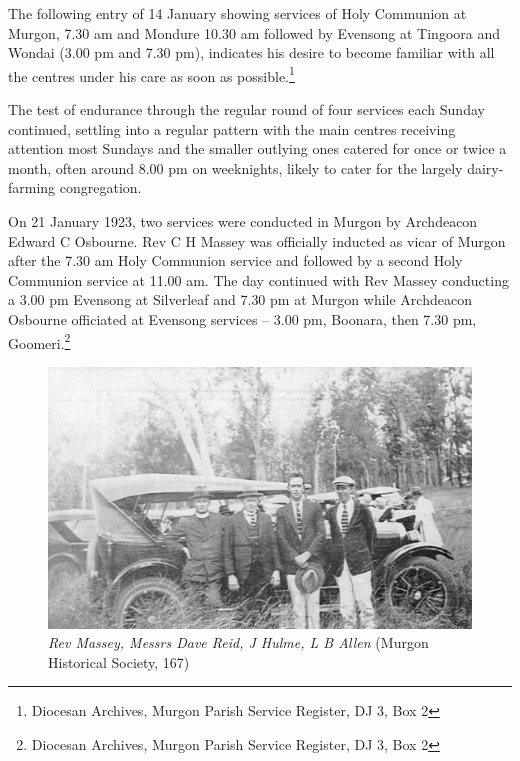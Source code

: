 \smallskip


The following entry of 14 January showing services of Holy Communion at Murgon, 7.30 am and Mondure 10.30 am followed by Evensong at Tingoora and Wondai (3.00 pm and 7.30 pm), indicates his desire to become familiar with all the centres under his care as soon as possible.\footnote{Diocesan Archives, Murgon Parish Service Register, DJ 3, Box 2}


The test of endurance through the regular round of four services each Sunday continued, settling into a regular pattern with the main centres receiving attention most Sundays and the smaller outlying ones catered for once or twice a month, often around 8.00 pm on weeknights, likely to cater for the largely dairy-farming congregation.



On 21 January 1923, two services were conducted in Murgon by Archdeacon Edward C Osbourne. Rev C H Massey was officially inducted as vicar of Murgon after the 7.30 am Holy Communion service and followed by a second Holy Communion service at 11.00 am. The day continued with Rev Massey conducting a 3.00 pm Evensong at Silverleaf and 7.30 pm at Murgon while Archdeacon Osbourne officiated at Evensong services -- 3.00 pm, Boonara, then 7.30 pm, Goomeri.\footnote{Diocesan Archives, Murgon Parish Service Register, DJ 3, Box 2}








\begin{figure}
\begin{center}
\includegraphics[width=1.\linewidth,center]{../images/masseyRACQ.jpg}
\caption{{\itshape Rev Massey, Messrs Dave Reid, J Hulme, L B Allen} {\scriptsize(Murgon Historical Society, 167)}}
\end{center}
\end{figure}




